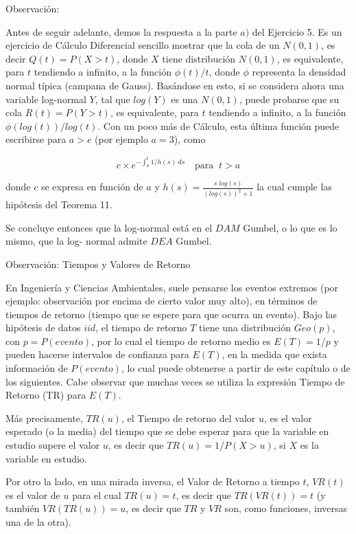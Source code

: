\documentclass[
  oneside]{book}
\begin{document}
Observación:

Antes de seguir adelante, demos la respuesta a la parte \(a)\) del
Ejercicio 5. Es un ejercicio de Cálculo Diferencial sencillo mostrar que
la cola de un \(N(0,1)\), es decir \(Q(t)=P(X>t)\), donde \(X\) tiene
distribución \(N(0,1)\), es equivalente, para \(t\) tendiendo a
infinito, a la función \(\phi(t)/t\), donde \(\phi\) representa la
densidad normal típica (campana de Gauss). Basándose en esto, si se
considera ahora una variable log-normal \(Y\), tal que \(log(Y)\) es una
\(N(0,1)\), puede probarse que su cola \(R(t)=P(Y>t)\), es equivalente,
para \(t\) tendiendo a infinito, a la función \(\phi(log(t))/log(t)\).
Con un poco más de Cálculo, esta última función puede escribirse para
\(a>e\) (por ejemplo \(a=3\)), como

\begin{equation}
c\times e^{-\int_{a}^{t}1/h(s)\; ds} \quad \text{para }\: t>a
\end{equation}

donde \(c\) se expresa en función de \(a\) y
\(h(s)=\frac{s\; log(s)}{(log(s))^2+1}\) la cual cumple las hipótesis
del Teorema 11.

Se concluye entonces que la log-normal está en el \(DAM\) Gumbel, o lo
que es lo mismo, que la log- normal admite \(DEA\) Gumbel.

Observación: Tiempos y Valores de Retorno

En Ingeniería y Ciencias Ambientales, suele pensarse los eventos
extremos (por ejemplo: observación por encima de cierto valor muy alto),
en términos de tiempos de retorno (tiempo que se espere para que ocurra
un evento). Bajo las hipótesis de datos \(iid\), el tiempo de retorno
\(T\) tiene una distribución \(Geo(p)\), con \(p = P(evento)\), por lo
cual el tiempo de retorno medio es \(E(T)=1/p\) y pueden hacerse
intervalos de confianza para \(E(T)\), en la medida que exista
información de \(P(evento)\), lo cual puede obtenerse a partir de este
capítulo o de los siguientes. Cabe observar que muchas veces se utiliza
la expresión Tiempo de Retorno (TR) para \(E(T)\).

Más precisamente, \(TR(u)\), el Tiempo de retorno del valor \(u\), es el
valor esperado (o la media) del tiempo que se debe esperar para que la
variable en estudio supere el valor \(u\), es decir que
\(TR(u) = 1/P(X>u)\), si \(X\) es la variable en estudio.

Por otro la lado, en una mirada inversa, el Valor de Retorno a tiempo
\(t\), \(VR(t)\) es el valor de \(u\) para el cual \(TR(u)=t\), es decir
que \(TR(VR(t))=t\) (y también \(VR(TR(u))=u\), es decir que \(TR\) y
\(VR\) son, como funciones, inversas una de la otra).
\end{document}
